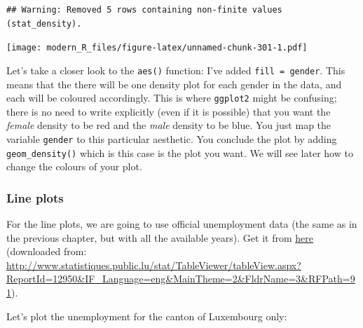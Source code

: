 \documentclass[]{gitbook}
\newenvironment{Shaded}{\begin{snugshade}}{\end{snugshade}}
\newcommand{\DataTypeTok}[1]{\textcolor[rgb]{0.13,0.29,0.53}{#1}}
\newcommand{\DecValTok}[1]{\textcolor[rgb]{0.00,0.00,0.81}{#1}}
\newcommand{\KeywordTok}[1]{\textcolor[rgb]{0.13,0.29,0.53}{\textbf{#1}}}
\newcommand{\NormalTok}[1]{#1}
\newcommand{\OperatorTok}[1]{\textcolor[rgb]{0.81,0.36,0.00}{\textbf{#1}}}
\newcommand{\StringTok}[1]{\textcolor[rgb]{0.31,0.60,0.02}{#1}}
\theoremstyle{definition}
\theoremstyle{definition}
\theoremstyle{definition}
\theoremstyle{remark}
\begin{document}
\begin{verbatim}
## Warning: Removed 5 rows containing non-finite values (stat_density).
\end{verbatim}

\texttt{[image: modern\_R\_files/figure-latex/unnamed-chunk-301-1.pdf]}

Let's take a closer look to the \texttt{aes()} function: I've added
\texttt{fill\ =\ gender}. This means that the there will be one density
plot for each gender in the data, and each will be coloured accordingly.
This is where \texttt{ggplot2} might be confusing; there is no need to
write explicitly (even if it is possible) that you want the
\emph{female} density to be red and the \emph{male} density to be blue.
You just map the variable \texttt{gender} to this particular aesthetic.
You conclude the plot by adding \texttt{geom\_density()} which is this
case is the plot you want. We will see later how to change the colours
of your plot.

\hypertarget{line-plots}{%
\subsubsection{Line plots}\label{line-plots}}

For the line plots, we are going to use official unemployment data (the
same as in the previous chapter, but with all the available years). Get
it from
\href{https://github.com/b-rodrigues/modern_R/tree/master/datasets/unemployment/all}{here}
(downloaded from:
\url{http://www.statistiques.public.lu/stat/TableViewer/tableView.aspx?ReportId=12950\&IF_Language=eng\&MainTheme=2\&FldrName=3\&RFPath=91}).

Let's plot the unemployment for the canton of Luxembourg only:

\begin{Shaded}
\end{Shaded}
\end{document}
